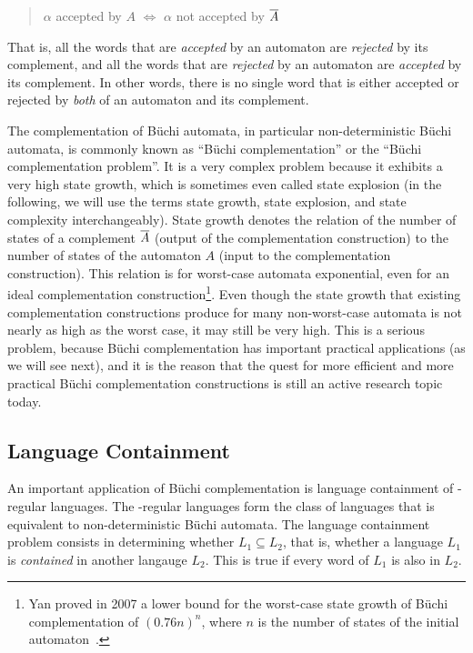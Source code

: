 \begin{quote}
\centering
$\alpha$ accepted by $A$ $\Longleftrightarrow$ $\alpha$ not accepted by $\cl1{A}$
\end{quote}

That is, all the words that are \textit{accepted} by an automaton are \textit{rejected} by its complement, and all the words that are \textit{rejected} by an automaton are \textit{accepted} by its complement. In other words, there is no single word that is either accepted or rejected by \textit{both} of an automaton and its complement.

The complementation of Büchi automata, in particular non-deterministic Büchi automata, is commonly known as ``Büchi complementation'' or the ``Büchi complementation problem''. It is a very complex problem because it exhibits a very high state growth, which is sometimes even called state explosion (in the following, we will use the terms state growth, state explosion, and state complexity interchangeably). State growth denotes the relation of the number of states of a complement $\cl1{A}$ (output of the complementation construction) to the number of states of the automaton $A$ (input to the complementation construction). This relation is for worst-case automata exponential, even for an ideal complementation construction\footnote{Yan proved in 2007 a lower bound for the worst-case state growth of Büchi complementation of $(0.76n)^n$, where $n$ is the number of states of the initial automaton~\cite{DBLP:journals/corr/abs-0802-1226}.}. Even though the state growth that existing complementation constructions produce for many non-worst-case automata is not nearly as high as the worst case, it may still be very high. This is a serious problem, because Büchi complementation has important practical applications (as we will see next), and it is the reason that the quest for more efficient and more practical Büchi complementation constructions is still an active research topic today.


\subsection{Language Containment}
An important application of Büchi complementation is language containment of \om-regular languages. The \om-regular languages form the class of languages that is equivalent to non-deterministic Büchi automata. The language containment problem consists in determining whether $L_1 \subseteq L_2$, that is, whether a language $L_1$ is \textit{contained} in another langauge $L_2$. This is true if every word of $L_1$ is also in $L_2$.

